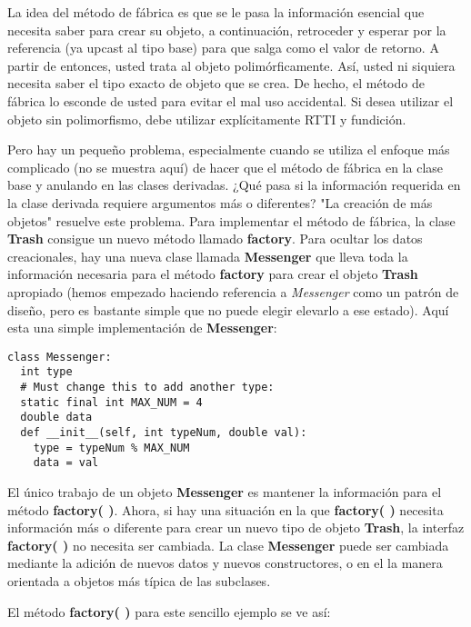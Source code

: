 La idea del método de fábrica es que se le pasa la información esencial que necesita saber para crear su objeto, a continuación, retroceder y esperar por la referencia (ya upcast al tipo base) para que salga como el valor de retorno.  A partir de entonces, usted trata al objeto polimórficamente. Así, usted ni siquiera necesita saber el tipo exacto de objeto que se crea. De hecho, el método de fábrica lo esconde de usted para evitar el mal uso accidental. Si desea utilizar el objeto sin polimorfismo, debe utilizar explícitamente RTTI y fundición.    \newline

Pero hay un pequeño problema, especialmente cuando se utiliza el enfoque más complicado (no se muestra aquí) de hacer que el método de fábrica en la clase base y anulando en las clases derivadas. ¿Qué pasa si la información requerida en la clase derivada requiere argumentos más o diferentes? "La creación de más objetos" resuelve este problema. Para implementar el método de fábrica, la clase \textbf{Trash} consigue un nuevo método llamado \textbf{factory}. Para ocultar los datos creacionales, hay una nueva clase llamada \textbf{Messenger} que lleva toda la información necesaria para el método \textbf{factory} para crear el objeto \textbf{Trash} apropiado (hemos empezado haciendo referencia a \textit{Messenger} como un patrón de diseño, pero es bastante simple que no puede elegir elevarlo a ese estado). Aquí esta una simple implementación de \textbf{Messenger}:     \newline

\begin{lstlisting}
class Messenger: 
  int type 
  # Must change this to add another type: 
  static final int MAX_NUM = 4 
  double data 
  def __init__(self, int typeNum, double val): 
    type = typeNum % MAX_NUM 
    data = val 
\end{lstlisting}

El único trabajo de un objeto \textbf{Messenger} es mantener la información para el método \textbf{factory( )}. Ahora, si hay una situación en la que \textbf{factory( )} necesita información más o diferente para crear un nuevo tipo de objeto \textbf{Trash}, la interfaz \textbf{factory( )} no necesita ser cambiada. La clase \textbf{Messenger} puede ser cambiada mediante la adición de nuevos datos y nuevos constructores, o en el la manera orientada a objetos más típica de las subclases.   \newline

El método \textbf{factory( )} para este sencillo ejemplo se ve así:     \newline

